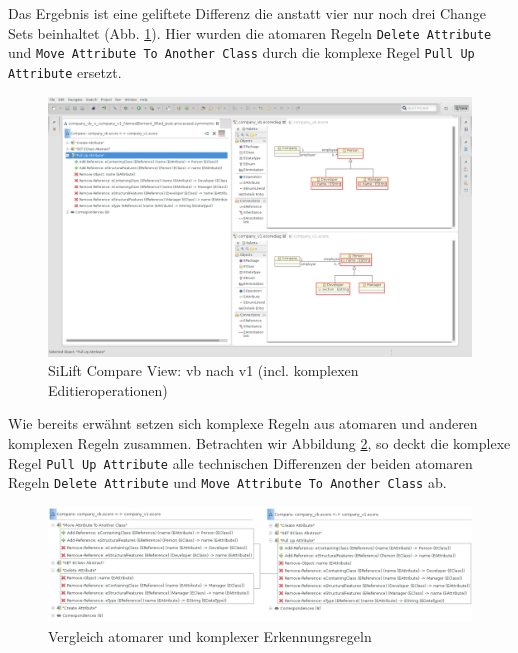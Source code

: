 \documentclass[a4paper]{scrartcl}
\begin{document}
Das Ergebnis ist eine geliftete Differenz die anstatt vier nur noch drei Change Sets beinhaltet  (Abb. \ref{silift-tutorial_compare_compare_view_complex}).
Hier wurden die atomaren Regeln \texttt{Delete Attribute} und \texttt{Move Attribute To Another Class} durch die komplexe Regel \texttt{Pull Up Attribute} ersetzt.

\begin{figure}[H]
\centering
\includegraphics[width=\textwidth]{graphics/silift-tutorial_compare_compare_view_complex.png}
\caption{SiLift Compare View: vb nach v1 (incl. komplexen Editieroperationen)}
\label{silift-tutorial_compare_compare_view_complex}
\end{figure}

Wie bereits erwähnt setzen sich komplexe Regeln aus atomaren und anderen komplexen Regeln zusammen.
Betrachten wir Abbildung \ref{silift-tutorial_compare_atomic_vs_complex}, so deckt die komplexe Regel \texttt{Pull Up Attribute} alle technischen Differenzen der beiden atomaren Regeln \texttt{Delete Attribute} und \texttt{Move Attribute To Another Class} ab.

\begin{figure}[H]
\centering
\includegraphics[width=\textwidth]{graphics/silift-tutorial_compare_atomic_vs_complex.png}
\caption{Vergleich atomarer und komplexer Erkennungsregeln}
\label{silift-tutorial_compare_atomic_vs_complex}
\end{figure}
\end{document}

